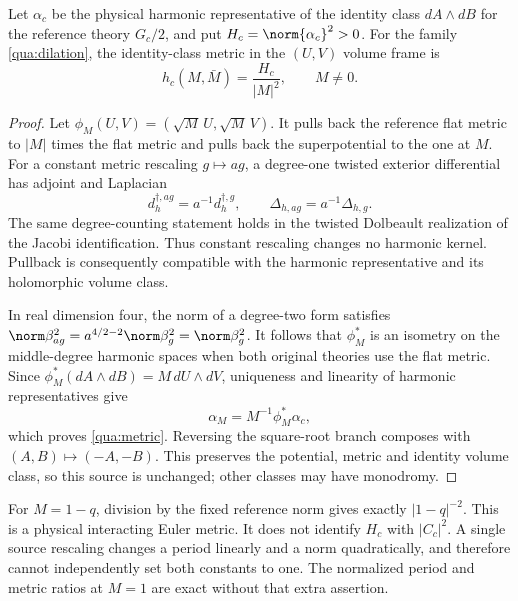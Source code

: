 \begin{proposition}\label{qua:physical-metric}
Let $\alpha_c$ be the physical harmonic representative of the identity class $dA\wedge dB$ for the reference theory $G_c/2$, and put $H_c=\norm{\alpha_c}^2>0$. For the family \eqref{qua:dilation}, the identity-class metric in the $(U,V)$ volume frame is
\begin{equation}\label{qua:metric}
h_c(M,\bar M)=\frac{H_c}{|M|^2},\qquad M\ne0.
\end{equation}
\end{proposition}
\begin{proof}
Let $\phi_M(U,V)=(\sqrt M\,U,\sqrt M\,V)$. It pulls back the reference flat metric to $|M|$ times the flat metric and pulls back the superpotential to the one at $M$. For a constant metric rescaling $g\mapsto ag$, a degree-one twisted exterior differential has adjoint and Laplacian
\[
d_h^{\dagger,ag}=a^{-1}d_h^{\dagger,g},\qquad
\Delta_{h,ag}=a^{-1}\Delta_{h,g}.
\]
The same degree-counting statement holds in the twisted Dolbeault realization of the Jacobi identification. Thus constant rescaling changes no harmonic kernel. Pullback is consequently compatible with the harmonic representative and its holomorphic volume class.

In real dimension four, the norm of a degree-two form satisfies
$\norm\beta_{ag}^2=a^{4/2-2}\norm\beta_g^2=\norm\beta_g^2$.
It follows that $\phi_M^*$ is an isometry on the middle-degree harmonic spaces when both original theories use the flat metric. Since
$\phi_M^*(dA\wedge dB)=M\,dU\wedge dV$, uniqueness and linearity of harmonic representatives give
\[
\alpha_M=M^{-1}\phi_M^*\alpha_c,
\]
which proves \eqref{qua:metric}. Reversing the square-root branch composes with $(A,B)\mapsto(-A,-B)$. This preserves the potential, metric and identity volume class, so this source is unchanged; other classes may have monodromy.
\end{proof}
For $M=1-q$, division by the fixed reference norm gives exactly $|1-q|^{-2}$. This is a physical interacting Euler metric. It does not identify $H_c$ with $|C_c|^2$. A single source rescaling changes a period linearly and a norm quadratically, and therefore cannot independently set both constants to one. The normalized period and metric ratios at $M=1$ are exact without that extra assertion.

